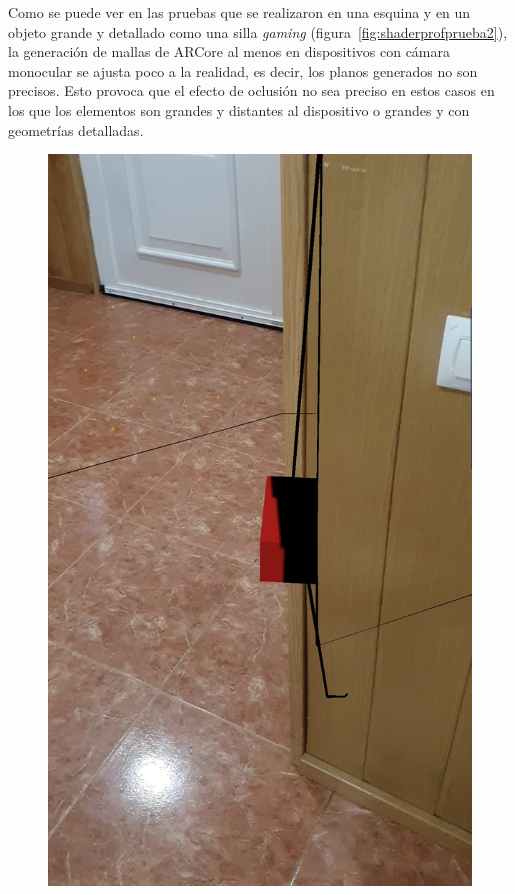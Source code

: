 Como se puede ver en las pruebas que se realizaron en una esquina y en un objeto grande y detallado como una silla \textit{gaming} (figura~\ref{fig:shaderprofprueba2}), la generación de mallas de ARCore al menos en dispositivos con cámara monocular se ajusta poco a la realidad, es decir, los planos generados no son precisos. Esto provoca que el efecto de oclusión no sea preciso en estos casos en los que los elementos son grandes y distantes al dispositivo o grandes y con geometrías detalladas.

\begin{figure}[H]
\centering
    \hspace{-4mm}
    \begin{minipage}{0.5\textwidth}
        \centering
        \includegraphics[scale=0.15]{Images/Shaders/oclusionprueba2 (1).jpg}\\

\end{minipage}
\end{figure}
